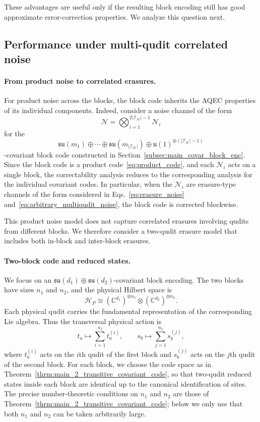 \documentclass[10pt,twocolumn,superscriptaddress,aps,amsmath,amssymb,citeautoscript,floatfix,prx,longbibliography]{revtex4-2}
\newcounter{alg}
\theoremstyle{plain}
\theoremstyle{plain}
\theoremstyle{plain}
\theoremstyle{plain}
\theoremstyle{plain}
\theoremstyle{plain}
\begin{document}
These advantages are useful only if the resulting block encoding still has good approximate error-correction properties. We analyze this question next.

\subsection{Performance under multi-qudit correlated noise}\label{subsec:main_covar_analog_noise}

\paragraph{From product noise to correlated erasures.}

For product noise across the blocks, the block code inherits the AQEC properties of its individual components. Indeed, consider a noise channel of the form
$$
\mathcal N
=
\bigotimes_{i=1}^{2|\mathcal I_{\mathcal H}|-1}
\mathcal N_i
$$
for the
$$
\mathfrak{su}(m_1)
\oplus
\cdots
\oplus
\mathfrak{su}(m_{|\mathcal I_{\mathcal H}|})
\oplus
\mathfrak{u}(1)^{\oplus(|\mathcal I_{\mathcal H}|-1)}
$$
-covariant block code constructed in Section~\ref{subsec:main_covar_block_enc}. Since the block code is a product code~\eqref{eq:product_code}, and each $\mathcal N_i$ acts on a single block, the correctability analysis reduces to the corresponding analysis for the individual covariant codes. In particular, when the $\mathcal N_i$ are erasure-type channels of the form considered in Eqs.~\eqref{eq:erasure_noise} and~\eqref{eq:arbitrary_multiqudit_noise}, the block code is corrected blockwise.

This product noise model does not capture correlated erasures involving qudits from different blocks. We therefore consider a two-qudit erasure model that includes both in-block and inter-block erasures.

\paragraph{Two-block code and reduced states.}

We focus on an
$\mathfrak{su}(d_1)\oplus\mathfrak{su}(d_2)$-covariant block encoding. The two blocks have sizes $n_1$ and $n_2$, and the physical Hilbert space is
$$
\mathcal H_P
\cong
(\mathbb C^{d_1})^{\otimes n_1}
\otimes
(\mathbb C^{d_2})^{\otimes n_2}.
$$
Each physical qudit carries the fundamental representation of the corresponding Lie algebra. Thus the transversal physical action is
$$
t_a
\longmapsto
\sum_{i=1}^{n_1} t_a^{(i)},
\qquad
s_b
\longmapsto
\sum_{j=1}^{n_2} s_b^{(j)},
$$
where $t_a^{(i)}$ acts on the $i$th qudit of the first block and $s_b^{(j)}$ acts on the $j$th qudit of the second block. For each block, we choose the code space as in Theorem~\ref{thrm:main_2_transitive_covariant_code}, so that two-qudit reduced states inside each block are identical up to the canonical identification of sites. The precise number-theoretic conditions on $n_1$ and $n_2$ are those of Theorem~\ref{thrm:main_2_transitive_covariant_code}; below we only use that both $n_1$ and $n_2$ can be taken arbitrarily large.
\end{document}
